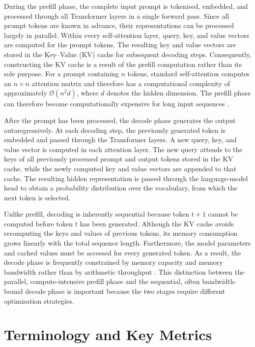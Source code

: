 During the prefill phase, the complete input prompt is tokenised, embedded, and processed
through all Transformer layers in a single forward pass. Since all prompt tokens are known
in advance, their representations can be processed largely in parallel. Within every
self-attention layer, query, key, and value vectors are computed for the prompt tokens.
The resulting key and value vectors are stored in the Key--Value (KV) cache for subsequent
decoding steps. Consequently, constructing the KV cache is a result of the prefill
computation rather than its sole purpose. For a prompt containing \(n\) tokens, standard
self-attention computes an \(n \times n\) attention matrix and therefore has a computational
complexity of approximately \(\mathcal{O}(n^{2}d)\), where \(d\) denotes the hidden
dimension. The prefill phase can therefore become computationally expensive for long
input sequences \cite{vaswani2017attention,yuan2024llminference}.

After the prompt has been processed, the decode phase generates the output
autoregressively. At each decoding step, the previously generated token is embedded and
passed through the Transformer layers. A new query, key, and value vector is computed in
each attention layer. The new query attends to the keys of all previously processed prompt
and output tokens stored in the KV cache, while the newly computed key and value vectors
are appended to that cache. The resulting hidden representation is passed through the
language-model head to obtain a probability distribution over the vocabulary, from which
the next token is selected.

Unlike prefill, decoding is inherently sequential because token \(t+1\) cannot be computed
before token \(t\) has been generated. Although the KV cache avoids recomputing the keys
and values of previous tokens, its memory consumption grows linearly with the total
sequence length. Furthermore, the model parameters and cached values must be accessed
for every generated token. As a result, the decode phase is frequently constrained by
memory capacity and memory bandwidth rather than by arithmetic throughput
\cite{yuan2024llminference,zhou2024efficientinf}. This distinction between the parallel,
compute-intensive prefill phase and the sequential, often bandwidth-bound decode phase
is important because the two stages require different optimisation strategies.

\section{Terminology and Key Metrics}\label{sec:taxonomy}

